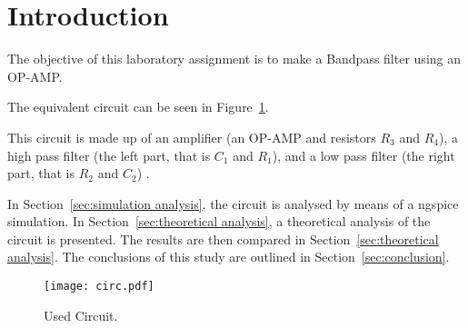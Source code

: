 \section{Introduction}
\label{sec:introduction}

\indent

The objective of this laboratory assignment is to make a Bandpass filter using an OP-AMP.

The equivalent circuit can be seen in Figure~\ref{fig:circuit}. 

This circuit is made up of an amplifier (an OP-AMP and resistors $R_3$ and $R_4$), a high pass filter (the left part, that is $C_1$ and $R_1$),  and a low pass filter (the right part, that is $R_2$ and $C_2$) .

In Section~\ref{sec:simulation analysis}, the circuit is analysed by
means of a ngspice simulation. In Section~\ref{sec:theoretical analysis}, a theoretical analysis of the circuit is
presented. The results are then compared in Section~\ref{sec:theoretical analysis}. The conclusions of this study are outlined in Section~\ref{sec:conclusion}.



\begin{figure}[h!] \centering
	\texttt{[image: circ.pdf]}
	\caption{Used Circuit.}
	\label{fig:circuit}
\end{figure}





